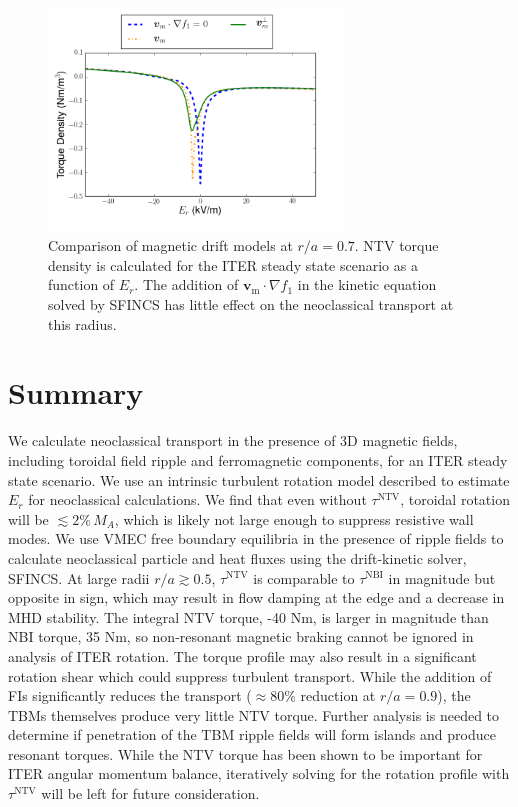 \documentclass[aip, pop, preprint]{revtex4-1}
\numberwithin{figure}{section}
\numberwithin{equation}{section}
\begin{document}
\begin{figure}[h!]
\centering
\includegraphics[width=0.7\textwidth]{mdscomparison.png}
\caption{\label{fig:driftschemes} Comparison of magnetic drift models at $r/a = 0.7$. NTV torque density is calculated for the ITER steady state scenario as a function of $E_r$. The addition of $\bm{v}_{\text{m}} \cdot \nabla f_1$ in the kinetic equation solved by SFINCS has little effect on the neoclassical transport at this radius. }
\end{figure}

\FloatBarrier

\section{Summary}\label{summary}

We calculate neoclassical transport in the presence of 3D magnetic fields, including toroidal field ripple and ferromagnetic components, for an ITER steady state scenario. We use an intrinsic turbulent rotation model described to estimate $E_r$ for neoclassical calculations. We find that even without $\tau^{\text{NTV}}$, toroidal rotation will be $\lesssim 2\% \,M_A$, which is likely not large enough to suppress resistive wall modes.\cite{Liu2004} We use VMEC free boundary equilibria in the presence of ripple fields to calculate neoclassical particle and heat fluxes using the drift-kinetic solver, SFINCS. At large radii $r/a \gtrsim 0.5$, $\tau^{\text{NTV}}$ is comparable to $\tau^{\text{NBI}}$ in magnitude but opposite in sign, which may result in flow damping at the edge and a decrease in MHD stability. The integral NTV torque, -40 Nm, is larger in magnitude than NBI torque, 35 Nm, so non-resonant magnetic braking cannot be ignored in analysis of ITER rotation. The torque profile may also result in a significant rotation shear which could suppress turbulent transport. While the addition of FIs significantly reduces the transport ($\approx 80\%$ reduction at $r/a = 0.9$), the TBMs themselves produce very little NTV torque. Further analysis is needed to determine if penetration of the TBM ripple fields will form islands and produce resonant torques. While the NTV torque has been shown to be important for ITER angular momentum balance, iteratively solving for the rotation profile with $\tau^{\text{NTV}}$ will be left for future consideration.
\end{document}
